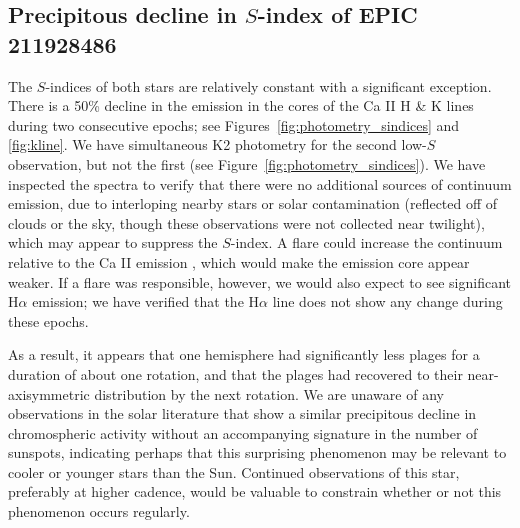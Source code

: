 \subsection{Precipitous decline in $S$-index of EPIC 211928486}

The $S$-indices of both stars are relatively constant with a significant exception. There is a 50\% decline in the emission in the cores of the Ca II H \& K lines during two consecutive epochs; %
see Figures~\ref{fig:photometry_sindices} and \ref{fig:kline}. We have simultaneous K2 photometry for the second low-$S$ observation, but not the first (see Figure~\ref{fig:photometry_sindices}). We have inspected the spectra to verify that there were no additional sources of continuum emission, due to interloping nearby stars or solar contamination (reflected off of clouds or the sky, though these observations were not collected near twilight), which may appear to suppress the $S$-index. A flare could increase the continuum relative to the Ca II emission \citep{Kowalski2013}, which would make the emission core appear weaker.
If a flare was responsible, however, we would also expect to see significant H$\alpha$ emission; we have verified that the H$\alpha$ line does not show any change during these epochs. 

As a result, it appears that one hemisphere had significantly less plages for a duration of about one rotation, and that the plages had recovered to their near-axisymmetric distribution by the next rotation. We are unaware of any observations in the solar literature that show a similar precipitous decline in chromospheric activity without an accompanying signature in the number of sunspots, indicating perhaps that this surprising phenomenon may be relevant to cooler or younger stars than the Sun. Continued observations of this star, preferably at higher cadence, would be valuable to constrain whether or not this phenomenon occurs regularly.

